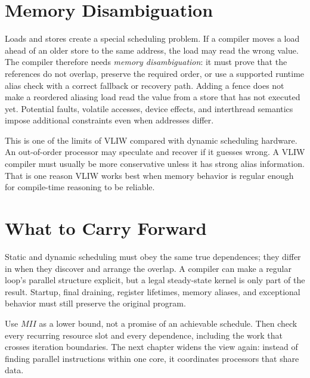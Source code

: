 \section{Memory Disambiguation}\label{sec:ilp-vliw-memory-disambiguation}
Loads and stores create a special scheduling problem.
If a compiler moves a load ahead of an older store to the same address, the load may read the wrong value.
The compiler therefore needs \textit{memory disambiguation}: it must prove that the references do not overlap, preserve the required order, or use a supported runtime alias check with a correct fallback or recovery path.
Adding a fence does not make a reordered aliasing load read the value from a store that has not executed yet.
Potential faults, volatile accesses, device effects, and interthread semantics impose additional constraints even when addresses differ.

This is one of the limits of VLIW compared with dynamic scheduling hardware.
An out-of-order processor may speculate and recover if it guesses wrong.
A VLIW compiler must usually be more conservative unless it has strong alias information.
That is one reason VLIW works best when memory behavior is regular enough for compile-time reasoning to be reliable.


\section{What to Carry Forward}\label{sec:chapter7-summary-vliw}
Static and dynamic scheduling must obey the same true dependences; they differ in when they discover and arrange the overlap.
A compiler can make a regular loop's parallel structure explicit, but a legal steady-state kernel is only part of the result.
Startup, final draining, register lifetimes, memory aliases, and exceptional behavior must still preserve the original program.

Use $MII$ as a lower bound, not a promise of an achievable schedule.
Then check every recurring resource slot and every dependence, including the work that crosses iteration boundaries.
The next chapter widens the view again: instead of finding parallel instructions within one core, it coordinates processors that share data.


